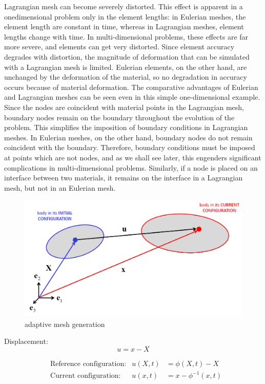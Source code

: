 Lagrangian mesh can become severely distorted. This effect is apparent in a onedimensional problem only in the element lengths: in Eulerian meshes, the
element length are constant in time, whereas in Lagrangian meshes, element lengths change with time. In multi-dimensional problems, these effects
are far more severe, and elements can get very distorted. Since element accuracy degrades with distortion, the magnitude of deformation that can be
simulated with a Lagrangian mesh is limited. Eulerian elements, on the other hand, are unchanged by the deformation of the material, so no degradation in accuracy occurs because of material deformation.
The comparative advantages of Eulerian and Lagrangian meshes can be seen even in this simple one-dimensional example. Since the nodes are
coincident with material points in the Lagrangian mesh, boundary nodes remain on the boundary throughout the evolution of the problem. This
simplifies the imposition of boundary conditions in Lagrangian meshes.
In Eulerian meshes, on the other hand, boundary nodes do not remain coincident with the boundary. Therefore, boundary conditions must be imposed at points which are not nodes, and as we shall see later, this engenders significant complications in multi-dimensional problems. Similarly, if a node is placed on an interface between two materials, it remains on the interface in a Lagrangian mesh, but not in an Eulerian mesh.

\begin{figure}
\centering
  \includegraphics[height=6cm]{img/Def.png}
   \caption{adaptive mesh generation}
 \label{fgr:graft}
\end{figure}
Displacement:
\begin{equation}
u=x-X
\end{equation}

\begin{align}
&\textrm{Reference configuration:}& u(X,t)&=\phi(X,t)-X \\
&\textrm{Current configuration:}& u(x,t)&=x-\phi^{-1}(x,t)
\end{align}

